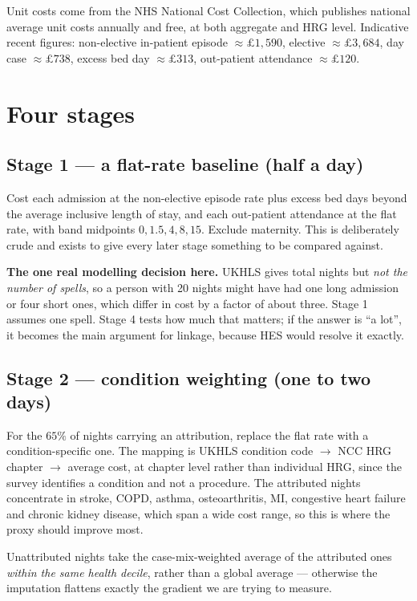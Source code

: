 \documentclass[11pt]{article}
\begin{document}
Unit costs come from the NHS National Cost Collection, which publishes
national average unit costs annually and free, at both aggregate and
HRG level. Indicative recent figures: non-elective in-patient episode
$\approx\pounds1{,}590$, elective $\approx\pounds3{,}684$, day case
$\approx\pounds738$, excess bed day $\approx\pounds313$, out-patient
attendance $\approx\pounds120$.

\section{Four stages}

\subsection*{Stage 1 --- a flat-rate baseline (half a day)}

Cost each admission at the non-elective episode rate plus excess bed days
beyond the average inclusive length of stay, and each out-patient attendance
at the flat rate, with band midpoints $0, 1.5, 4, 8, 15$. Exclude maternity.
This is deliberately crude and exists to give every later stage something to
be compared against.

\textbf{The one real modelling decision here.} UKHLS gives total nights but
\emph{not the number of spells}, so a person with 20 nights might have had one
long admission or four short ones, which differ in cost by a factor of about
three. Stage 1 assumes one spell. Stage 4 tests how much that matters; if the
answer is ``a lot'', it becomes the main argument for linkage, because HES
would resolve it exactly.

\subsection*{Stage 2 --- condition weighting (one to two days)}

For the $65\%$ of nights carrying an attribution, replace the flat rate with
a condition-specific one. The mapping is UKHLS condition code $\rightarrow$
NCC HRG chapter $\rightarrow$ average cost, at chapter level rather than
individual HRG, since the survey identifies a condition and not a procedure.
The attributed nights concentrate in stroke, COPD, asthma, osteoarthritis,
MI, congestive heart failure and chronic kidney disease, which span a wide
cost range, so this is where the proxy should improve most.

Unattributed nights take the case-mix-weighted average of the attributed
ones \emph{within the same health decile}, rather than a global average ---
otherwise the imputation flattens exactly the gradient we are trying to
measure.
\end{document}
